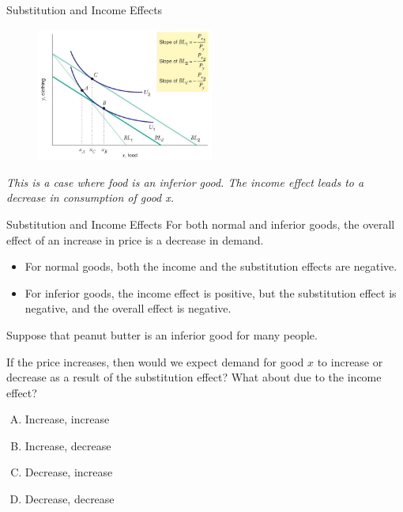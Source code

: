 \documentclass[11pt,t]{beamer}
\begin{document}
\begin{frame}{Substitution and Income Effects}
  \begin{figure}
    \includegraphics[width=220px]{figures/fig5_8.jpg}
  \end{figure}

  \emph{This is a case where food is an inferior good. The income effect leads to a decrease in consumption of good x.}
\end{frame}

\begin{frame}{Substitution and Income Effects}
  For both normal and inferior goods, the overall effect of an increase in price is a decrease in demand.

  \bigskip
  \begin{itemize}
    \item For normal goods, both the income and the substitution effects are negative.

    \item For inferior goods, the income effect is positive, but the substitution effect is negative, and the overall effect is negative.
  \end{itemize}
\end{frame}

\begin{frame}

  \bigskip
  Suppose that peanut butter is an inferior good for many people. 
  
  \smallskip
  If the price increases, then would we expect demand for good $x$ to increase or decrease as a result of the substitution effect? What about due to the income effect?

  \bigskip
  \begin{enumerate}[A)]
    \item Increase, increase
    \item Increase, decrease
    \item Decrease, increase
    \item Decrease, decrease
  \end{enumerate}
\end{frame}
\end{document}
